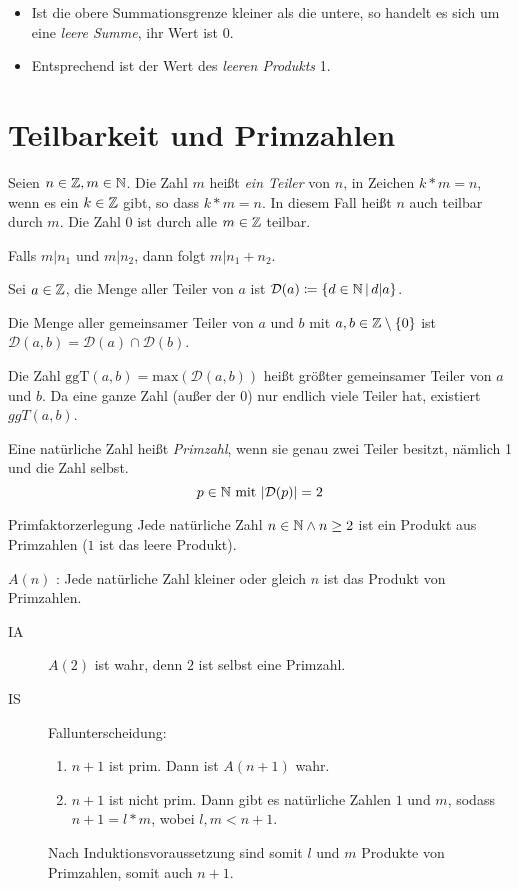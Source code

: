 \bemerkung
\begin{itemize}
  \item Ist die obere Summationsgrenze kleiner als die untere, so handelt es sich um eine \emph{leere Summe}, ihr Wert ist 0.
  \item Entsprechend ist der Wert des \emph{leeren Produkts} 1.
\end{itemize}


\section{Teilbarkeit und Primzahlen}
Seien $n\in\mathbb{Z}, m\in\mathbb{N}$. Die Zahl $m$ heißt \emph{ein Teiler} von $n$, in Zeichen $k* m=n$, wenn es ein $k\in\mathbb{Z}$ gibt, so dass $k* m = n$. In diesem Fall heißt $n$ auch teilbar durch $m$.
Die Zahl $0$ ist durch alle $m\in\mathbb{Z}$ teilbar.

Falls $m|n_1$ und $m|n_2$, dann folgt $m|n_1+n_2$.

Sei $a\in\mathbb{Z}$, die Menge aller Teiler von $a$ ist $\mathcal{D}(a)\coloneqq\left\{ d\in\mathbb{N} \,\middle|\, d|a \right\}$.

Die Menge aller gemeinsamer Teiler von $a$ und $b$ mit $a,b\in\mathbb{Z}\setminus\{ 0\}$ ist $\mathcal{D}(a,b) = \mathcal{D}(a) \cap \mathcal{D}(b)$.

Die Zahl $\mathrm{ggT}(a,b) = \mathrm{max}(\mathcal{D}(a,b))$ heißt größter gemeinsamer Teiler von $a$ und $b$. Da eine ganze Zahl (außer der $0$) nur endlich viele Teiler hat, existiert $ggT(a,b)$.


Eine natürliche Zahl heißt \emph{Primzahl}, wenn sie genau zwei Teiler besitzt, nämlich 1 und die Zahl selbst.
\begin{equation*}
  p\in\mathbb{N} \text{ mit } |\mathcal{D}(p)| = 2
\end{equation*}

\begin{satz}{Primfaktorzerlegung}
  Jede natürliche Zahl $n\in\mathbb{N} \wedge n\geq2$ ist ein Produkt aus Primzahlen ($1$ ist das leere Produkt).
\end{satz}

\beweis
$A(n)$ : \glqq Jede natürliche Zahl kleiner oder gleich $n$ ist das Produkt von Primzahlen.\grqq

\begin{description}
  \item[IA] $A(2)$ ist wahr, denn $2$ ist selbst eine Primzahl.
  \item[IS] Fallunterscheidung:
  \begin{enumerate}
    \item $n+1$ ist prim. Dann ist $A(n+1)$ wahr.
    \item $n+1$ ist nicht prim. Dann gibt es natürliche Zahlen $1$ und $m$, sodass $n+1=l* m$, wobei $l,m<n+1$.
  \end{enumerate}
  Nach Induktionsvoraussetzung sind somit $l$ und $m$ Produkte von Primzahlen, somit auch $n+1$.
\end{description}
